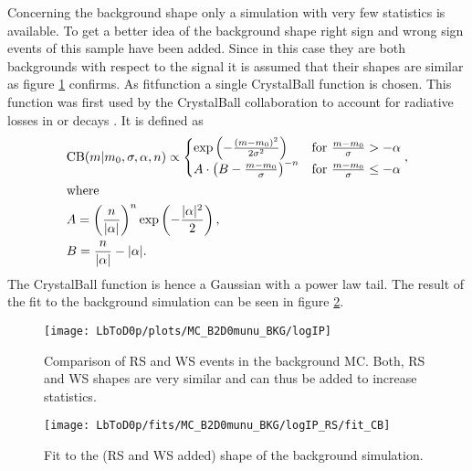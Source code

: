 Concerning the background shape only a simulation with very few statistics is available.
To get a better idea of the background \logIP shape right sign and wrong sign events of this sample have been added.
Since in this case they are both backgrounds with respect to the \logIP signal it is assumed that their shapes are similar as figure \ref{fig:plot_logIP_MC_BKG} confirms. 
As fitfunction a single CrystalBall function is chosen. 
This function was first used by the CrystalBall collaboration to account for radiative losses in \jpsi or \psitwos decays \cite{CrystalBall}. It is defined as 
\begin{align}
    &\text{CB}(m|m_0, \sigma, \alpha, n) \propto
    \begin{cases}
        \exp \left(-\frac{(m-m_0)^2}{2\sigma^2}\right)     & \text{for } \frac{m-m_0}{\sigma} > -\alpha \\
        A \cdot \left(B - \frac{m-m_0}{\sigma}\right)^{-n} & \text{for } \frac{m-m_0}{\sigma} \leq -\alpha
    \end{cases}, \\
    &\text{where} \\
    &A = \left(\frac{n}{|\alpha|}\right)^n \exp\left(-\frac{|\alpha|^2}{2}\right), \\
    &B = \frac{n}{|\alpha|} - |\alpha|.
\end{align}
The CrystalBall function is hence a Gaussian with a power law tail. 
The result of the fit to the background simulation can be seen in figure \ref{fig:fit_logIP_MC_BKG}.
\begin{figure}[hptb]
    \centering
	\texttt{[image: LbToD0p/plots/MC\_B2D0munu\_BKG/logIP]}
	\caption{Comparison of RS and WS events in the background MC. Both, RS and WS shapes are very similar and can thus be added to increase statistics.}
    \label{fig:plot_logIP_MC_BKG}
\end{figure}
\begin{figure}[hptb]
    \centering
	\texttt{[image: LbToD0p/fits/MC\_B2D0munu\_BKG/logIP\_RS/fit\_CB]}
	\caption{Fit to the (RS and WS added) \logIP shape of the background simulation.}
    \label{fig:fit_logIP_MC_BKG}
\end{figure}

